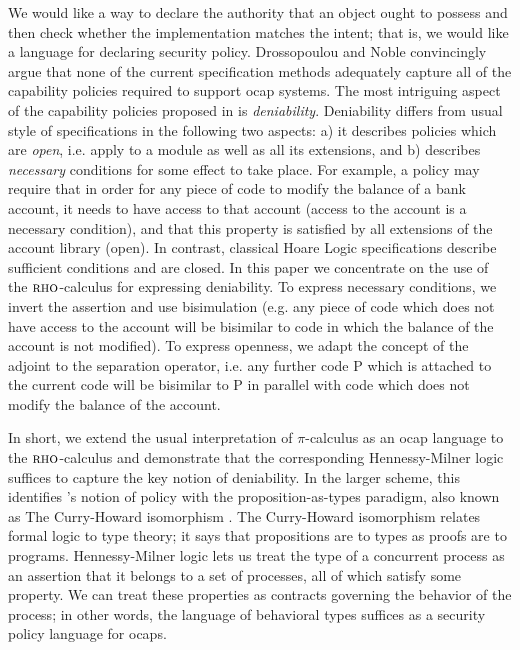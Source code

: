\documentclass[submission,copyright,creativecommons]{eptcs}
\numberwithin{equation}{subsection}
\newcommand{\rhoc}{${\textsc{rho}}$-calculus}
\begin{document}
We would like a way to declare the authority that an object ought to
possess and then check whether the implementation matches the intent;
that is, we would like a language for declaring security policy.
Drossopoulou and Noble \cite{Drossopoulou:2013:NCP:2489804.2489811}
convincingly argue that none of the current specification methods
adequately capture all of the capability policies required to support
ocap systems. The most intriguing aspect of the capability policies
proposed in \cite{Drossopoulou:2013:NCP:2489804.2489811} is {\em
  deniability}. Deniability differs from usual style of specifications
in the following two aspects: a) it describes policies which are {\em
  open}, i.e. apply to a module as well as all its extensions, and b)
describes {\em necessary} conditions for some effect to take
place. For example, a policy may require that in order for any piece
of code to modify the balance of a bank account, it needs to have
access to that account (access to the account is a necessary
condition), and that this property is satisfied by all extensions of
the account library (open). In contrast, classical Hoare Logic
specifications \cite{Hoare:1969:ABC:363235.363259} describe sufficient
conditions and are closed.  In this paper we concentrate on the use of
the {\rhoc} \cite{DBLP:conf/tgc/MeredithR05} for expressing
deniability. To express necessary conditions, we invert the assertion
and use bisimulation (e.g. any piece of code which does not have
access to the account will be bisimilar to code in which the balance
of the account is not modified). To express openness, we adapt the
concept of the adjoint to the separation operator, i.e. any further
code P which is attached to the current code will be bisimilar to P in
parallel with code which does not modify the balance of the account.

In short, we extend the usual interpretation of $\pi$-calculus as an
ocap language to the \rhoc\; and demonstrate that the corresponding
Hennessy-Milner logic suffices to capture the key notion of
deniability. In the larger scheme, this identifies
\cite{Drossopoulou:2013:NCP:2489804.2489811}'s notion of policy with
the proposition-as-types paradigm, also known as The Curry-Howard
isomorphism \cite{Abramsky:1992:PP:194588.194591}. The Curry-Howard
isomorphism relates formal logic to type theory; it says that
propositions are to types as proofs are to programs.  Hennessy-Milner
logic lets us treat the type of a concurrent process as an assertion
that it belongs to a set of processes, all of which satisfy some
property.  We can treat these properties as contracts governing the
behavior of the process; in other words, the language of behavioral
types suffices as a security policy language for ocaps.
\end{document}
